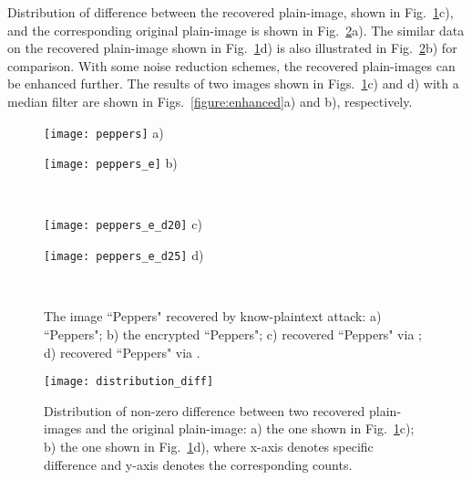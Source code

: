 \documentclass[3p,preprint,11pt]{elsarticle}
\newlength\imagewidth
\newlength\figwidth
\begin{document}
Distribution of difference between the recovered plain-image, shown
in Fig.~\ref{figure:KnownPlainTextAttack}c), and the corresponding
original plain-image is shown in Fig.~\ref{figure:distri_diff}a).
The similar data on the recovered plain-image shown in
Fig.~\ref{figure:KnownPlainTextAttack}d) is also illustrated in
Fig.~\ref{figure:distri_diff}b) for comparison. With some noise
reduction schemes, the recovered plain-images can be enhanced
further. The results of two images shown in
Figs.~\ref{figure:KnownPlainTextAttack}c) and d) with a 
median filter are shown in Figs.~\ref{figure:enhanced}a) and b),
respectively.

\begin{figure}[!htb]
\centering
\begin{minipage}[t]{\figwidth}
\centering
\texttt{[image: peppers]}
a)
\end{minipage}
\begin{minipage}[t]{\figwidth}
\centering
\texttt{[image: peppers\_e]}
b)
\end{minipage}\\
\begin{minipage}[t]{\figwidth}
\centering
\texttt{[image: peppers\_e\_d20]}
c)
\end{minipage}
\begin{minipage}[t]{\figwidth}
\centering
\texttt{[image: peppers\_e\_d25]}
d)
\end{minipage}\\
\caption{The image ``Peppers" recovered by know-plaintext attack: a)
``Peppers"; b) the encrypted ``Peppers"; c) recovered ``Peppers" via
; d) recovered ``Peppers" via .}
\label{figure:KnownPlainTextAttack}
\end{figure}

\begin{figure}
\centering
\begin{minipage}[t]{1.5\imagewidth}
\centering
\texttt{[image: distribution\_diff]}
\end{minipage}
\caption{Distribution of non-zero difference between two recovered
plain-images and the original plain-image: a) the one shown in
Fig.~\ref{figure:KnownPlainTextAttack}c); b) the one shown in
Fig.~\ref{figure:KnownPlainTextAttack}d), where x-axis denotes specific difference
and y-axis denotes the corresponding counts.}
\label{figure:distri_diff}
\end{figure}
\end{document}
